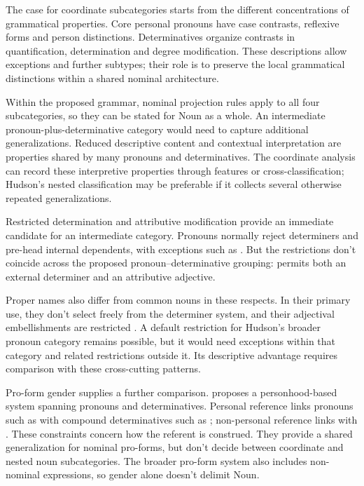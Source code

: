 \documentclass[12pt]{article}
\begin{document}
The case for coordinate subcategories starts from the different concentrations of grammatical properties. Core personal pronouns have case contrasts, reflexive forms and person distinctions. Determinatives organize contrasts in quantification, determination and degree modification. These descriptions allow exceptions and further subtypes; their role is to preserve the local grammatical distinctions within a shared nominal architecture.

Within the proposed grammar, nominal projection rules apply to all four subcategories, so they can be stated for Noun as a whole. An intermediate pronoun-plus-determinative category would need to capture additional generalizations. Reduced descriptive content and contextual interpretation are properties shared by many pronouns and determinatives. The coordinate analysis can record these interpretive properties through features or cross-classification; Hudson's nested classification may be preferable if it collects several otherwise repeated generalizations.

Restricted determination and attributive modification provide an immediate candidate for an intermediate category. Pronouns normally reject determiners and pre-head internal dependents, with exceptions such as  \citep[429--430]{huddleston2002}. But the restrictions don't coincide across the proposed pronoun--determinative grouping:  permits both an external determiner and an attributive adjective.

Proper names also differ from common nouns in these respects. In their primary use, they don't select freely from the determiner system, and their adjectival embellishments are restricted \citep[517, 519--520]{huddleston2002}. A default restriction for Hudson's broader pronoun category remains possible, but it would need exceptions within that category and related restrictions outside it. Its descriptive advantage requires comparison with these cross-cutting patterns.

Pro-form gender supplies a further comparison. \textcite{reynolds2025proformgender} proposes a personhood-based system spanning pronouns and determinatives. Personal reference links pronouns such as  with compound determinatives such as ; non-personal reference links  with . These constraints concern how the referent is construed. They provide a shared generalization for nominal pro-forms, but don't decide between coordinate and nested noun subcategories. The broader pro-form system also includes non-nominal expressions, so gender alone doesn't delimit Noun.
\end{document}
